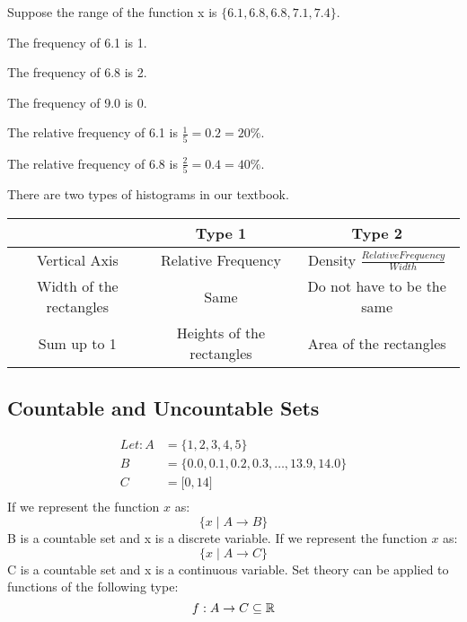 \documentclass[letterpaper, 12pt]{math}
\begin{document}
Suppose the range of the function x is
\( \big\{ 6.1, 6.8, 6.8, 7.1, 7.4 \big\} \).

The frequency of 6.1 is 1. \par
The frequency of 6.8 is 2. \par
The frequency of 9.0 is 0. \par
The relative frequency of 6.1 is \( \frac{1}{5} = 0.2 = 20\% \). \par
The relative frequency of 6.8 is \( \frac{2}{5} = 0.4 = 40\% \).
\begin{center}
\end{center}
There are two types of histograms in our textbook.
\begin{center}
  \begin{tabular}{|c|c|c|}
    \hline
    & Type 1 & Type 2 \\ \hline
    Vertical Axis & Relative Frequency &
        Density \( \frac{Relative Frequency}{Width} \) \\ \hline
    Width of the rectangles & Same & Do not have to be the same \\ \hline
    Sum up to 1 & Heights of the rectangles &
        Area of the rectangles \\ \hline
  \end{tabular}
\end{center}

\subsection*{Countable and Uncountable Sets}
\begin{align*}
  Let: A &= \bigg\{ 1, 2, 3, 4, 5 \bigg\} \\
  B &= \bigg\{ 0.0, 0.1, 0.2, 0.3, \dots, 13.9, 14.0 \bigg\} \\
  C &= \bigg[ 0, 14 \bigg] \\
\end{align*}
If we represent the function \( x \) as:
\[ \bigg\{ x \mid A \to B \bigg\} \]
B is a countable set and x is a discrete variable.
If we represent the function \( x \) as:
\[ \bigg\{ x \mid A \to C \bigg\} \]
C is a countable set and x is a continuous variable.
Set theory can be applied to functions of the following type:
\[ f:A \to C \subseteq \mathbb{R} \]
\end{document}
